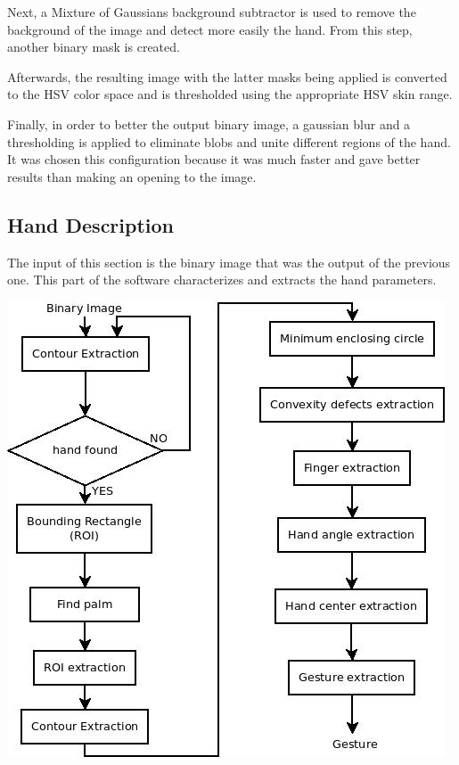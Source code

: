 Next, a Mixture of Gaussians background subtractor is used to remove the background of the image and detect more easily the hand. From this step, another binary mask is created. 

Afterwards, the resulting image with the latter masks being applied is converted to the HSV color space and is thresholded using the appropriate HSV skin range.

Finally, in order to better the output binary image, a gaussian blur and a thresholding is applied to eliminate blobs and unite different regions of the hand. It was chosen this configuration because it was much faster and gave better results than making an opening to the image. 

 
\subsection{Hand Description}

The input of this section is the binary image that was the output of the previous one. This part of the software characterizes and extracts the hand parameters. 

\begin{center}
\includegraphics[scale=0.5]{../hand_description.jpeg} 
\end{center}

